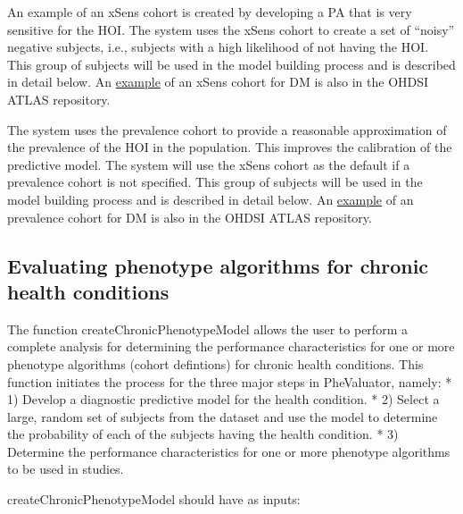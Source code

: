 \documentclass[
]{article}
\begin{document}
An example of an xSens cohort is created by developing a PA that is very
sensitive for the HOI. The system uses the xSens cohort to create a set
of ``noisy'' negative subjects, i.e., subjects with a high likelihood of
not having the HOI. This group of subjects will be used in the model
building process and is described in detail below. An
\href{http://www.ohdsi.org/web/atlas/\#/cohortdefinition/1770120}{example}
of an xSens cohort for DM is also in the OHDSI ATLAS repository.

The system uses the prevalence cohort to provide a reasonable
approximation of the prevalence of the HOI in the population. This
improves the calibration of the predictive model. The system will use
the xSens cohort as the default if a prevalence cohort is not specified.
This group of subjects will be used in the model building process and is
described in detail below. An
\href{http://www.ohdsi.org/web/atlas/\#/cohortdefinition/1770119}{example}
of an prevalence cohort for DM is also in the OHDSI ATLAS repository.

\hypertarget{evaluating-phenotype-algorithms-for-chronic-health-conditions}{%
\subsection{Evaluating phenotype algorithms for chronic health
conditions}\label{evaluating-phenotype-algorithms-for-chronic-health-conditions}}

The function createChronicPhenotypeModel allows the user to perform a
complete analysis for determining the performance characteristics for
one or more phenotype algorithms (cohort defintions) for chronic health
conditions. This function initiates the process for the three major
steps in PheValuator, namely: * 1) Develop a diagnostic predictive model
for the health condition. * 2) Select a large, random set of subjects
from the dataset and use the model to determine the probability of each
of the subjects having the health condition. * 3) Determine the
performance characteristics for one or more phenotype algorithms to be
used in studies.

createChronicPhenotypeModel should have as inputs:
\end{document}
